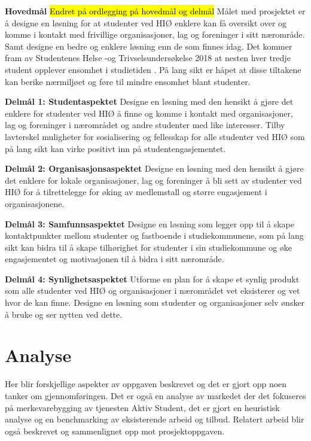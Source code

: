 \begin{compactitem}
\item [{\bf Hovedmål}] \hl{Endret på ordlegging på hovedmål og delmål} Målet med prosjektet er å designe en løsning for at studenter ved HIØ enklere kan få oversikt over og komme i kontakt med frivillige organisasjoner, lag og foreninger i sitt nærområde. Samt designe en bedre og enklere løsning enn de som finnes idag. Det kommer fram av Studentenes Helse -og Trivselsundersøkelse 2018 at nesten hver tredje student opplever ensomhet i studietiden \cite{SHOT:2}. På lang sikt er håpet at disse tiltakene kan berike nærmiljøet og føre til mindre ensomhet blant studenter.
\begin{compactitem}
\item [{\bf  Delmål 1: Studentaspektet} ] Designe en løsning med den hensikt å gjøre det enklere for studenter ved HIØ å finne og komme i kontakt med organisasjoner, lag og foreninger i nærområdet og andre studenter med like interesser. Tilby lavterskel muligheter for sosialisering og fellesskap for alle studenter ved HIØ som på lang sikt kan virke positivt inn på studentengasjementet.
\item [{\bf  Delmål 2: Organisasjonsaspektet} ] Designe en løsning med den hensikt å gjøre det enklere for lokale organisasjoner, lag og foreninger å bli sett av studenter ved HIØ for å tilrettelegge for øking av medlemstall og større engasjement i organisasjonene.
\item [{\bf  Delmål 3: Samfunnsaspektet} ] Designe en løsning som legger opp til å skape kontaktpunkter mellom studenter og fastboende i studiekommunene, som på lang sikt kan bidra til å skape tilhørighet for studenter i sin studiekommune og øke engasjementet og motivasjonen til å bidra i sitt nærområde.
\item [{\bf  Delmål 4: Synlighetsaspektet} ] Utforme en plan for å skape et synlig produkt som alle studenter ved HIØ og organisasjoner i nærområdet vet eksisterer og vet hvor de kan finne. Designe en løsning som studenter og organisasjoner selv ønsker å bruke og ser nytten ved dette.
\end{compactitem} 
\end{compactitem}

\section{Analyse}
Her blir forskjellige aspekter av oppgaven beskrevet og det er gjort opp noen tanker om gjennomføringen. Det er også en analyse av markedet der det fokuseres på merkevarebygging av tjenesten Aktiv Student, det er gjort en heuristisk analyse og en benchmarking av eksisterende arbeid og tilbud. Relatert arbeid blir også beskrevet og sammenlignet opp mot prosjektoppgaven.

